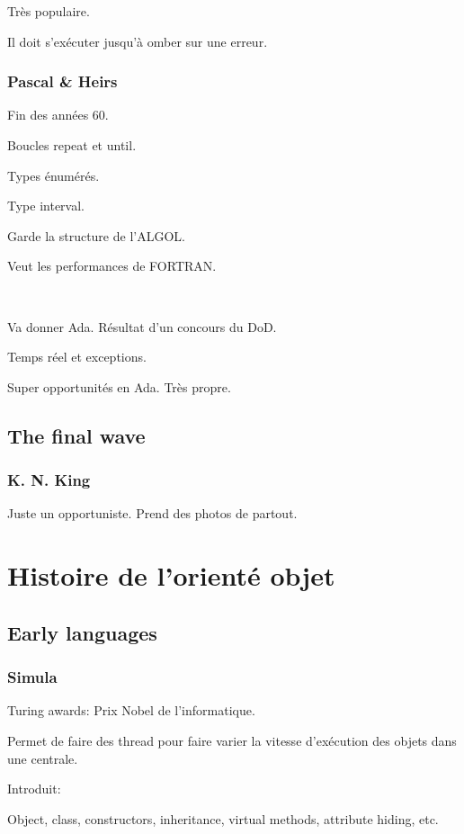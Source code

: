 \documentclass[a4paper,11pt]{article}
\begin{document}
Très populaire.

Il doit s'exécuter jusqu'à omber sur une erreur.

\subsubsection{Pascal \& Heirs}

Fin des années 60.

Boucles repeat et until.

Types énumérés.

Type interval.

Garde la structure de l'ALGOL.

Veut les performances de FORTRAN.

\

Va donner Ada. Résultat d'un concours du DoD.

Temps réel et exceptions.

Super opportunités en Ada. Très propre.

\subsection{The final wave}

\subsubsection{K. N. King}

Juste un opportuniste. Prend des photos de partout.

\section{Histoire de l'orienté objet}

\subsection{Early languages}

\subsubsection{Simula}

Turing awards: Prix Nobel de l'informatique.

Permet de faire des thread pour faire varier la vitesse d'exécution des objets
dans une centrale.

Introduit:

Object, class, constructors, inheritance, virtual methods, attribute hiding, etc.
\end{document}
